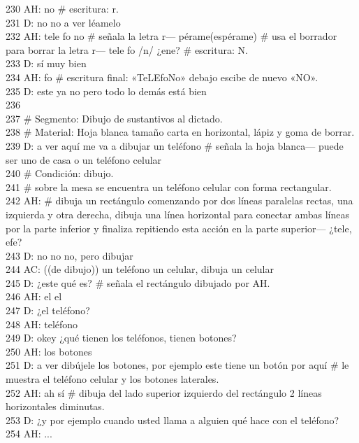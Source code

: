 230 AH: no \# escritura: r.\\
231 D: no no a ver léamelo\\
232 AH: tele fo no \# señala la letra r--- pérame(espérame) \# usa el borrador para borrar la letra r--- tele fo /n/ ¿ene? \# escritura: N.\\
233 D: sí muy bien\\
234 AH: fo \# escritura final: «TeLEfoNo» debajo escibe de nuevo «NO».\\
235 D: este ya no pero todo lo demás está bien\\
236 \\
237 \# Segmento: Dibujo de sustantivos al dictado.\\
238 \# Material: Hoja blanca tamaño carta en horizontal, lápiz y goma de borrar.\\
239 D: a ver aquí me va a dibujar un teléfono \# señala la hoja blanca--- puede ser uno de casa o un teléfono celular\\
240 \# Condición: dibujo.\\
241 \# sobre la mesa se encuentra un teléfono celular con forma rectangular.\\
242 AH: \# dibuja un rectángulo comenzando por dos líneas paralelas rectas, una izquierda y otra derecha, dibuja una línea horizontal para conectar ambas líneas por la parte inferior y finaliza repitiendo esta acción en la parte superior--- ¿tele, efe?\\
243 D: no no no, pero dibujar\\
244 AC: ((de dibujo)) un teléfono un celular, dibuja un celular\\
245 D: ¿este qué es? \# señala el rectángulo dibujado por AH.\\
246 AH: el el\\
247 D: ¿el teléfono?\\
248 AH: teléfono\\
249 D: okey ¿qué tienen los teléfonos, tienen botones?\\
250 AH: los botones\\
251 D: a ver dibújele los botones, por ejemplo este tiene un botón por aquí \# le muestra el teléfono celular y los botones laterales.\\
252 AH: ah sí \# dibuja del lado superior izquierdo del rectángulo 2 líneas horizontales diminutas.\\
253 D: ¿y por ejemplo cuando usted llama a alguien qué hace con el teléfono?\\
254 AH: ...\\
